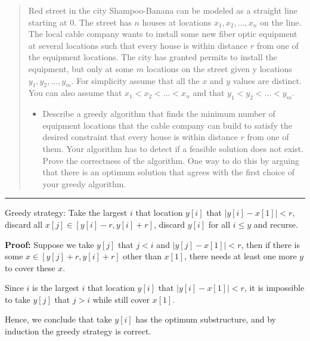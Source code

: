 \documentclass[11pt]{article}
\begin{document}



\begin{quote}
	Red street in the city Shampoo-Banana can be modeled as a
  straight line starting at $0$.  The street has $n$ houses at
  locations $x_1,x_2,\ldots,x_n$ on the line. The local cable company
  wants to install some new fiber optic equipment at several locations
  such that every house is within distance $r$ from one of the
  equipment locations. The city has granted permits to install the
  equipment, but only at some $m$ locations on the street given y
  locations $y_1,y_2, \ldots,y_m$. For simplicity assume that all the
  $x$ and $y$ values are distinct. You can also assume that
  $x_1 < x_2 < \ldots < x_n$ and that $y_1 < y_2 < \ldots < y_m$.
  \begin{itemize}
  \item Describe a greedy algorithm that finds the minimum number of
    equipment locations that the cable company can build to satisfy
    the desired constraint that every house is within distance $r$
    from one of them.  Your algorithm has to detect if a feasible
    solution does not exist. Prove the correctness of the
    algorithm. One way to do this by arguing that there is an optimum
    solution that agrees with the first choice of your greedy
    algorithm.
    \end{itemize}
\end{quote}
\hrule

\begin{solution}
	Greedy strategy: Take the largest $i$ that location $y[i]$ that $|y[i] - x[1]| < r$, discard all $x[j] \in [y[i] - r, y[i] + r]$, discard $y[i]$ for all $i \leq y$ and recurse.
	
	\textbf{Proof:}
		Suppose we take $y[j]$ that $j < i$ and $|y[j] - x[1]| < r$, then if there is some $x \in [y[j] + r, y[i] + r]$ other than $x[1]$, there needs at least one more $y$ to cover these $x$. 
		
		Since $i$ is the largest $i$ that location $y[i]$ that $|y[i] - x[1]| < r$, it is impossible to take $y[j]$ that $j > i$ while still cover $x[1]$.
		
		Hence, we conclude that take $y[i]$ has the optimum substructure, and by induction the greedy strategy is correct.
		
\end{solution}
\clearpage
\end{document}
